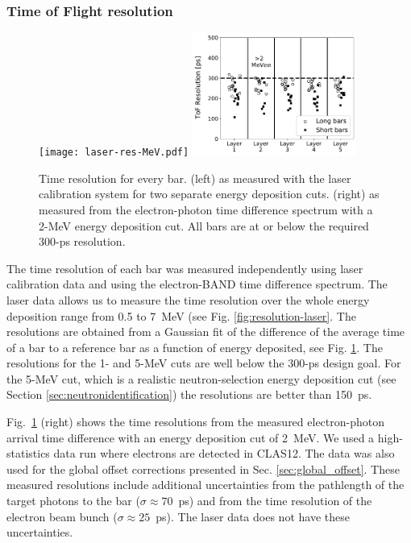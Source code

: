 \documentclass[3p,final,twocolumn]{elsarticle}
\begin{document}
\subsubsection{Time of Flight resolution}
\label{sec:tofresolution}
\begin{figure}[tb]
	\centering
			\texttt{[image: laser-res-MeV.pdf]}
		\includegraphics[width=0.48\textwidth]{tof-resolutions-photons-2MeV.pdf}
	\caption{Time resolution for every bar. (left) as measured
          with the laser calibration system for two separate energy
          deposition cuts\protect\footnotemark. (right) as measured
          from the electron-photon time difference spectrum with a
          2-\si{\mega\electronvolt} energy deposition cut. All bars
          are at or below the required 300-\si{\pico\s} resolution. }
	\label{fig:tof_resolution}
\end{figure}
\setcounter{footnote}{2} 
The time resolution of each bar was measured
independently using laser calibration data and using the electron-BAND
time difference spectrum. The laser data allows us to measure the time
resolution over the whole energy deposition range from 0.5 to 7~\si{\mega\electronvolt}  (see
Fig. \ref{fig:resolution-laser}.
The resolutions are obtained from a Gaussian fit of the difference of
the average time of a bar to a reference bar as a function of energy
deposited, see Fig. \ref{fig:tof_resolution}. The resolutions for the
1- and 5-\si{\mega\electronvolt} cuts are well below the 300-\si{\pico\s} design goal. For the 5-\si{\mega\electronvolt} cut, which
is a realistic neutron-selection energy deposition cut (see Section
\ref{sec:neutronidentification}) the resolutions are better than 150~\si{\pico\s}.

Fig.~\ref{fig:tof_resolution} (right) shows the time resolutions from
the measured electron-photon arrival time difference with an energy deposition cut of 2~\si{\mega\electronvolt}. We used a high-statistics data run where
electrons are detected in CLAS12. The data was also used for the
global offset corrections presented in Sec. \ref{sec:global_offset}.
These measured resolutions include
additional uncertainties from the pathlength of the target photons
to the bar ($\sigma\approx 70$~\si{\pico\s}) and from the time resolution of the electron beam bunch ($\sigma \approx 25$~\si{\pico\s}). The
laser data does not have these uncertainties.
\end{document}
